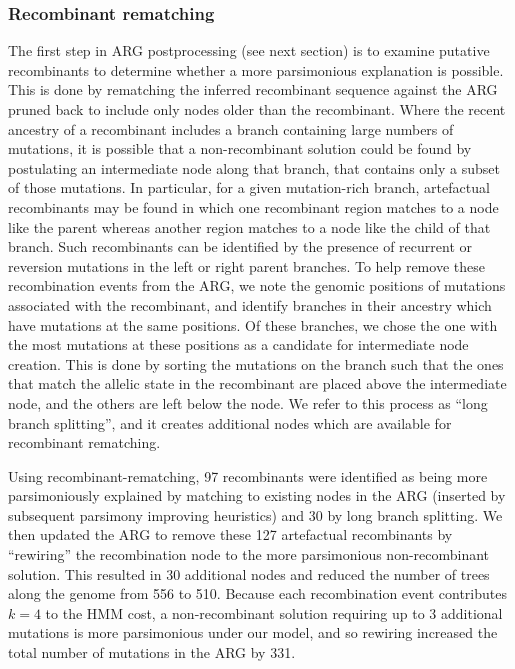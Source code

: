 \documentclass[12pt]{article}
\begin{document}
\subsubsection*{Recombinant rematching}
The first step in ARG postprocessing (see next section) is to examine putative recombinants to
determine whether a more parsimonious explanation is possible. This is done
by rematching the inferred recombinant sequence against the ARG pruned back
to include only nodes older than the recombinant.
Where the recent ancestry of a recombinant includes a branch containing
large numbers of mutations, it is possible
that a non-recombinant solution could be found by postulating an intermediate
node along that branch, that contains only a subset of those mutations.
In particular, for a given mutation-rich branch, artefactual recombinants may
be found in which one recombinant region matches to
a node like the parent whereas another region matches to a node like the child
of that branch. Such recombinants can be identified by the
presence of recurrent or reversion mutations in the left or right parent branches.
To help remove these recombination events from the ARG, we note the genomic positions
of mutations associated with the recombinant, and identify branches
in their ancestry which have mutations at the same positions. Of these branches,
we chose the one with the most mutations at these positions as
a candidate for intermediate node creation. This is done by sorting the
mutations on the branch such that the ones that match the allelic state in the
recombinant are placed above the intermediate node, and the others are left
below the node. We refer to this process as ``long branch splitting'', and it
creates additional nodes which are available for recombinant rematching.

Using recombinant-rematching,
97 recombinants were identified as being more parsimoniously
explained by matching to existing nodes in the ARG (inserted by
subsequent parsimony improving heuristics) and 30 by long branch
splitting.
We then updated the ARG to remove these 127 artefactual
recombinants by ``rewiring'' the recombination node to the
more parsimonious non-recombinant solution. This
resulted in 30 additional nodes and reduced
the number of trees along the genome from 556 to 510.
Because each recombination event contributes $k=4$ to the HMM cost,
a non-recombinant solution requiring up to 3 additional mutations
is more parsimonious under our model, and so rewiring
increased the total number of mutations in the ARG by 331.
\end{document}
